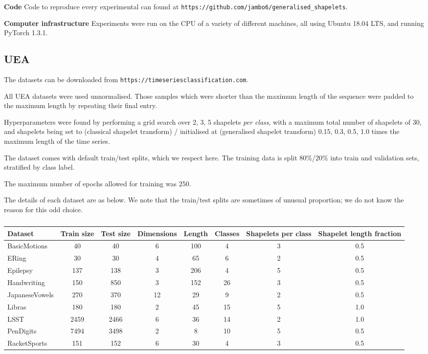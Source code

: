 \documentclass{article}
\theoremstyle{plain}
\theoremstyle{definition}
\newcommand{\boldheading}[1]{

\textbf{#1}\quad}
\begin{document}
	\boldheading{Code} Code to reproduce every experimental can found at \texttt{https://github.com/jambo6/generalised\_shapelets}.
	
	\boldheading{Computer infrastructure} Experiments were run on the CPU of a variety of different machines, all using Ubuntu 18.04 LTS, and running PyTorch 1.3.1.
	
	\subsection{UEA} \label{apx:uea}
	The datasets can be downloaded from \texttt{https://timeseriesclassification.com}.
	
	All UEA datasets were used unnormalised. Those samples which were shorter than the maximum length of the sequence were padded to the maximum length by repeating their final entry.
	
	Hyperparameters were found by performing a grid search over 2, 3, 5 shapelets \emph{per class}, with a maximum total number of shapelets of 30, and shapelets being set to (classical shapelet transform) / initialised at (generalised shapelet transform) 0.15, 0.3, 0.5, 1.0 times the maximum length of the time series.
	
	The dataset comes with default train/test splits, which we respect here. The training data is split 80\%/20\% into train and validation sets, stratified by class label.
	
	The maximum number of epochs allowed for training was 250.
	
	The details of each dataset are as below. We note that the train/test splits are sometimes of unusual proportion; we do not know the reason for this odd choice.

	\begin{table}[ht]
		\caption{}
		\label{tab:uea_hyperparams_old}
		\centering
		\begin{tabular}{lccccccc}
			\toprule
			Dataset & Train size & Test size & Dimensions & Length & Classes & \parbox{10mm}{Shapelets per class} & \parbox{10mm}{Shapelet length fraction} \\ \midrule
			BasicMotions    & 40 & 40 & 6 & 100 & 4 & 3 & 0.5 \\
			ERing           & 30 & 30 & 4 & 65 & 6 & 2 & 0.5 \\
			Epilepsy        & 137 & 138 & 3 & 206 & 4 & 5 & 0.5 \\
			Handwriting     & 150 & 850 & 3 & 152 & 26 & 3 & 0.5 \\
			JapaneseVowels  & 270 & 370 & 12 & 29 & 9 & 2 & 0.5 \\
			Libras          & 180 & 180 & 2 & 45 & 15 & 5 & 1.0 \\
			LSST            & 2459 & 2466 & 6 & 36 & 14 & 2 & 1.0 \\
			PenDigits       & 7494 & 3498 & 2 & 8 & 10 & 5 & 0.5 \\
			RacketSports    & 151 & 152 & 6 & 30 & 4 & 3 & 0.5 \\
			\bottomrule
		\end{tabular}
	\end{table}
\end{document}
